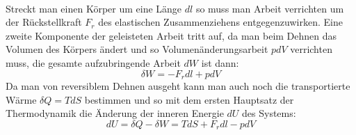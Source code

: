 \documentclass[11pt,a4paper]{article}
\numberwithin{equation}{section}
\numberwithin{figure}{section}
\begin{document}
\\
\begin{addmargin}[25pt]{0pt}
Streckt man einen Körper um eine Länge $\si{d}l$ so muss man Arbeit verrichten um der Rückstellkraft $F_r$ des elastischen Zusammenziehens entgegenzuwirken. Eine zweite Komponente der geleisteten Arbeit tritt auf, da man beim Dehnen das Volumen des Körpers ändert und so Volumenänderungsarbeit $p\si{d}V$ verrichten muss, die gesamte aufzubringende Arbeit $\si{d}W$ ist dann:
\begin{equation}\label{eq:geleistete_Arbeit_Zugversuch}
    \delta W = -F_r \si{d}l + p\si{d}V
\end{equation}
Da man von reversiblem Dehnen ausgeht kann man auch noch die transportierte Wärme $\delta Q = T\si{d}S$ bestimmen und so mit dem ersten Hauptsatz der Thermodynamik die Änderung der inneren Energie $\si{d}U$ des Systems:
\begin{equation}\label{eq:innere_Energie_Zugversuch}
    \si{d}U = \delta Q - \delta W = T\si{d}S + F_r \si{d}l - p\si{d}V
\end{equation}
\end{addmargin} 
\end{document}
